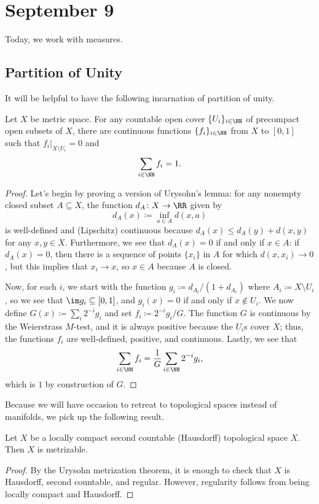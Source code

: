 \documentclass[../notes.tex]{subfiles}
\begin{document}
\section{September 9}
Today, we work with measures.

\subsection{Partition of Unity}
It will be helpful to have the following incarnation of partition of unity.
\begin{lemma} \label{lem:partition-unity}
	Let $X$ be metric space. For any countable open cover $\{U_i\}_{i\in\NN}$ of precompact open subsets of $X$, there are continuous functions $\{f_i\}_{i\in\NN}$ from $X$ to $[0,1]$ such that $f_i|_{X\setminus U_i}=0$ and
	\[\sum_{i\in\NN}f_i=1.\]
\end{lemma}
\begin{proof}
	Let's begin by proving a version of Urysohn's lemma: for any nonempty closed subset $A\subseteq X$, the function $d_A\colon X\to\RR$ given by
	\[d_A(x)\coloneqq\inf_{a\in A}d(x,a)\]
	is well-defined and (Lipschitz) continuous because $d_A(x)\le d_A(y)+d(x,y)$ for any $x,y\in X$. Furthermore, we see that $d_A(x)=0$ if and only if $x\in A$: if $d_A(x)=0$, then there is a sequence of points $\{x_i\}$ in $A$ for which $d(x,x_i)\to0$, but this implies that $x_i\to x$, so $x\in A$ because $A$ is closed.

	Now, for each $i$, we start with the function $g_i\coloneqq d_{A_i}/(1+d_{A_i})$ where $A_i\coloneqq X\setminus U_i$, so we see that $\im g_i\subseteq[0,1]$, and $g_i(x)=0$ if and only if $x\notin U_i$. We now define $G(x)\coloneqq\sum_i2^{-i}g_i$ and set $f_i\coloneqq2^{-i}g_i/G$. The function $G$ is continuous by the Weierstrass $M$-test, and it is always positive because the $U_i$s cover $X$; thus, the functions $f_i$ are well-defined, positive, and continuous. Lastly, we see that
	\[\sum_{i\in\NN}f_i=\frac1G\sum_{i\in\NN}2^{-i}g_i,\]
	which is $1$ by construction of $G$.
\end{proof}
Because we will have occasion to retreat to topological spaces instead of manifolds, we pick up the following result.
\begin{lemma} \label{lem:locally-compact-to-metric}
	Let $X$ be a locally compact second countable (Hausdorff) topological space $X$. Then $X$ is metrizable.
\end{lemma}
\begin{proof}
	By the Urysohn metrization theorem, it is enough to check that $X$ is Hausdorff, second countable, and regular. However, regularity follows from being locally compact and Hausdorff.
\end{proof}
\end{document}
